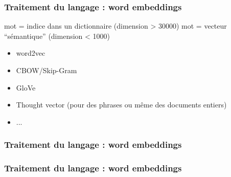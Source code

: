 \begin{frame}
  \frametitle{Traitement du langage : word embeddings} 
  mot = indice dans un dictionnaire (dimension > 30000)
  \newline
  mot = vecteur ``sémantique'' (dimension < 1000) 
  \begin{itemize}
  \item word2vec
  \item CBOW/Skip-Gram
  \item GloVe
  \item Thought vector (pour des phrases ou même des documents entiers)
  \item ...
  \end{itemize}
\end{frame}

\begin{frame}
  \frametitle{Traitement du langage : word embeddings} 
\end{frame}

\begin{frame}
  \frametitle{Traitement du langage : word embeddings} 
  \begin{center}
     \\
  \end{center}
\end{frame}

